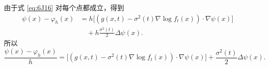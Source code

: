 由于式 \eqref{eq:6J16} 对每个点都成立，得到
\begin{equation*}
  \begin{aligned}
  \psi(x)-\varphi_h(x)
     &=h\bigl[(g(x,t)-\sigma^2(t)\nabla\log f_t(x))\cdot\nabla\psi(x)\bigr]\\
     &\quad+h\frac{\sigma^2(t)}2\Delta\psi(x).
  \end{aligned}
  \tag{6J17}\label{eq:6J17}
\end{equation*}
所以
\begin{equation*}
  \frac{\psi(x)-\varphi_h(x)}{h}
     =\bigl[(g(x,t)-\sigma^2(t)\nabla\log f_t(x))\cdot\nabla\psi(x)\bigr]
      +\frac{\sigma^2(t)}2\Delta\psi(x).
  \tag{6J18}\label{eq:6J18}
\end{equation*}
